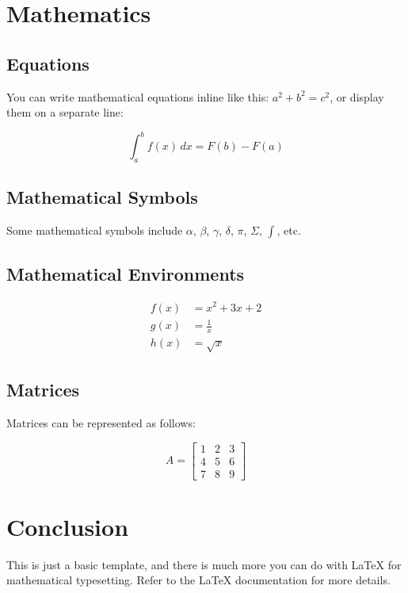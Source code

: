 \documentclass{article}
\begin{document}
\section{Mathematics}

\subsection{Equations}

You can write mathematical equations inline like this: $a^2 + b^2 = c^2$, or display them on a separate line:

\begin{equation}
  \int_{a}^{b} f(x) \,dx = F(b) - F(a)
\end{equation}

\subsection{Mathematical Symbols}

Some mathematical symbols include $\alpha$, $\beta$, $\gamma$, $\delta$, $\pi$, $\Sigma$, $\int$, etc.

\subsection{Mathematical Environments}

\begin{align}
  f(x) &= x^2 + 3x + 2 \\
  g(x) &= \frac{1}{x} \\
  h(x) &= \sqrt{x}
\end{align}

\subsection{Matrices}

Matrices can be represented as follows:

\[
A = \begin{bmatrix}
  1 & 2 & 3 \\
  4 & 5 & 6 \\
  7 & 8 & 9
\end{bmatrix}
\]

\section{Conclusion}

This is just a basic template, and there is much more you can do with LaTeX for mathematical typesetting. Refer to the LaTeX documentation for more details.

\end{document}
